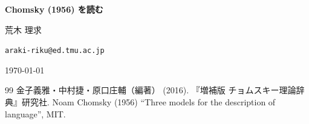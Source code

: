 \documentclass{jsarticle}
\begin{document}
\begin{center}
{\Large \textbf{Chomsky (1956) を読む}}\par
\vspace{0.5em}
荒木 理求\par
\texttt{araki-riku@ed.tmu.ac.jp}\par
\today
\end{center}

\begin{thebibliography}{99}
金子義雅・中村捷・原口庄輔（編著） (2016). 『増補版 チョムスキー理論辞典』研究社.
Noam Chomsky (1956) ``Three models for the description of language'', MIT.
\end{thebibliography}
\end{document}
